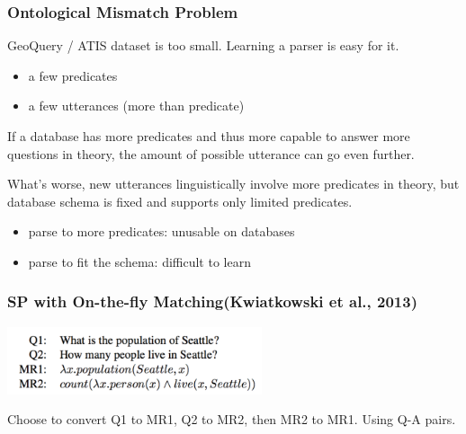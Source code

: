 \documentclass{beamer}
\begin{document}
\begin{frame}
    \frametitle{Ontological Mismatch Problem}

    GeoQuery / ATIS dataset is too small. Learning a parser is easy for it.
    \begin{itemize}
        \item a few predicates
        \item a few utterances (more than predicate)
    \end{itemize} \pause

    If a database has more predicates and thus more capable to answer more questions
    in theory, the amount of possible utterance can go even further. \pause

    What's worse, new utterances linguistically involve more predicates in theory,
    but database schema is fixed and supports only limited predicates. \pause

    \begin{itemize}
        \item parse to more predicates: unusable on databases
        \item parse to fit the schema: difficult to learn
    \end{itemize}

\end{frame}

\begin{frame}
    \frametitle{SP with On-the-fly Matching(Kwiatkowski et al., 2013)}

    \begin{center}
        \includegraphics[width=7.48cm,height=1.98cm]{img/ontological-mismatch.png}
    \end{center}

    Choose to convert Q1 to MR1, Q2 to MR2, then MR2 to MR1. Using Q-A pairs.
\end{frame}
\end{document}
